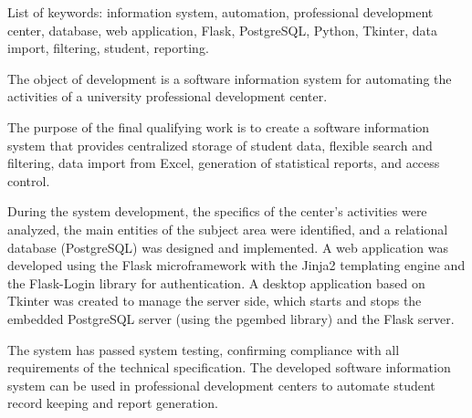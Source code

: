 List of keywords: information system, automation, professional development center, database, web application, Flask, PostgreSQL, Python, Tkinter, data import, filtering, student, reporting.

The object of development is a software information system for automating the activities of a university professional development center.

The purpose of the final qualifying work is to create a software information system that provides centralized storage of student data, flexible search and filtering, data import from Excel, generation of statistical reports, and access control.

During the system development, the specifics of the center's activities were analyzed, the main entities of the subject area were identified, and a relational database (PostgreSQL) was designed and implemented. A web application was developed using the Flask microframework with the Jinja2 templating engine and the Flask-Login library for authentication. A desktop application based on Tkinter was created to manage the server side, which starts and stops the embedded PostgreSQL server (using the pgembed library) and the Flask server.

The system has passed system testing, confirming compliance with all requirements of the technical specification. The developed software information system can be used in professional development centers to automate student record keeping and report generation.
